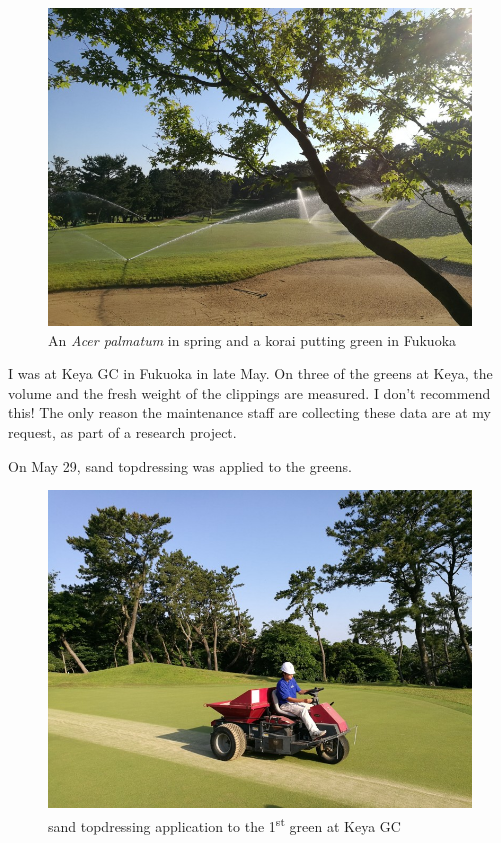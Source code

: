 \documentclass[12pt,b5,]{tufte-book}
\begin{document}
\begin{figure}
\centering
\includegraphics{img/keya_8_maple.jpg}
\caption{An \emph{Acer palmatum} in spring and a korai putting green in Fukuoka}
\end{figure}

I was at Keya GC in Fukuoka in late May. On three of the greens at Keya, the volume and the fresh weight of the clippings are measured. I don't recommend this! The only reason the maintenance staff are collecting these data are at my request, as part of a research project.

On May 29, sand topdressing was applied to the greens.

\begin{figure}
\centering
\includegraphics{img/keya_1_topdress.jpg}
\caption{sand topdressing application to the 1\textsuperscript{st} green at Keya GC}
\end{figure}
\end{document}
